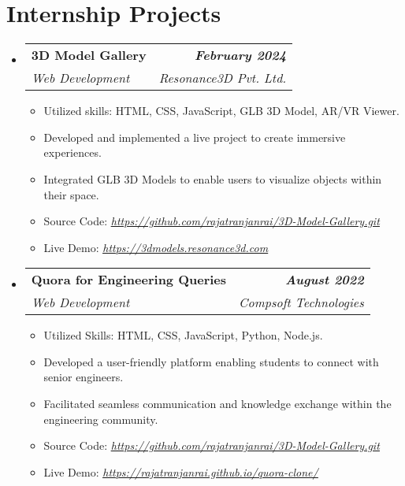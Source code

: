 \documentclass[letterpaper,11pt]{article}
\makeatletter
\newcommand{\resumeItem}[1]{
  \item\small{
    {#1 \vspace{-2pt}}
  }
}
\newcommand{\resumeSubheading}[4]{
  \vspace{-2pt}\item
    \begin{tabular*}{1.0\textwidth}[t]{l@{\extracolsep{\fill}}r}
      \textbf{#1} & \textbf{\small #2} \\
      \textit{\small#3} & \textit{\small #4} \\
    \end{tabular*}\vspace{-7pt}
}
\newcommand{\resumeSubHeadingListStart}{\begin{itemize}[leftmargin=0.0in, label={}]}
\newcommand{\resumeSubHeadingListEnd}{\end{itemize}}
\newcommand{\resumeItemListStart}{\begin{itemize}}
\newcommand{\resumeItemListEnd}{\end{itemize}\vspace{-5pt}}
\makeatother
\begin{document}
\section{Internship Projects}
\resumeSubHeadingListStart

\vspace{5pt}
\resumeSubheading
{3D Model Gallery}{\textit{February 2024}}
{Web Development}{Resonance3D Pvt. Ltd.}
\resumeItemListStart
    \resumeItem{Utilized skills: HTML, CSS, JavaScript, GLB 3D Model, AR/VR Viewer.}
    \resumeItem{Developed and implemented a live project to create immersive experiences.}
    \resumeItem{Integrated GLB 3D Models to enable users to visualize objects within their space.}
    \resumeItem{Source Code: \href{https://github.com/rajatranjanrai/3D-Model-Gallery.git}{\textit{\underline{https://github.com/rajatranjanrai/3D-Model-Gallery.git}}}}
    \resumeItem{Live Demo: \href{https://3dmodels.resonance3d.com}{\textit{\underline{https://3dmodels.resonance3d.com}}}}
\resumeItemListEnd

\vspace{5pt}
\resumeSubheading
{Quora for Engineering Queries}{\textit{August 2022}}
{Web Development}{Compsoft Technologies}
\resumeItemListStart
    \resumeItem{Utilized Skills: HTML, CSS, JavaScript, Python, Node.js.} \\
    \resumeItem{Developed a user-friendly platform enabling students to connect with senior engineers.} \\
    \resumeItem{Facilitated seamless communication and knowledge exchange within the engineering community.} \\
    \resumeItem{Source Code: \href{https://github.com/rajatranjanrai/Clone-Quora-.git}{\textit{\underline{https://github.com/rajatranjanrai/3D-Model-Gallery.git}}}} \\
    \resumeItem{Live Demo: \href{https://nikhilraj060.github.io/quora-clone/}{\textit{\underline{https://rajatranjanrai.github.io/quora-clone/}}}}
\resumeItemListEnd

\resumeSubHeadingListEnd
\vspace{-5pt}



\end{document}
